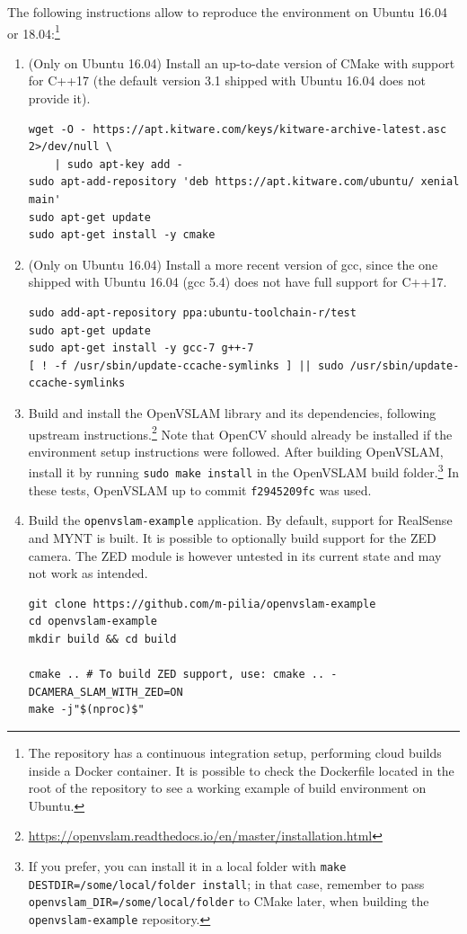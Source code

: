 \documentclass[11pt, letterpaper, twoside]{article}
\begin{document}
The following instructions allow to reproduce the environment on Ubuntu 16.04
or 18.04:\footnote{The repository has a continuous integration setup,
performing cloud builds inside a Docker container. It is possible to check
the Dockerfile located in the root of the repository to see a working
example of build environment on Ubuntu.}
\begin{enumerate}
    \item (Only on Ubuntu 16.04) Install an up-to-date version of CMake with
        support for C++17 (the default version 3.1 shipped with Ubuntu 16.04
        does not provide it).
\begin{verbatim}
wget -O - https://apt.kitware.com/keys/kitware-archive-latest.asc 2>/dev/null \
    | sudo apt-key add -
sudo apt-add-repository 'deb https://apt.kitware.com/ubuntu/ xenial main'
sudo apt-get update
sudo apt-get install -y cmake
\end{verbatim}

    \item (Only on Ubuntu 16.04) Install a more recent version of gcc, since
        the one shipped with Ubuntu 16.04 (gcc 5.4) does not have full support
        for C++17.
\begin{verbatim}
sudo add-apt-repository ppa:ubuntu-toolchain-r/test
sudo apt-get update
sudo apt-get install -y gcc-7 g++-7
[ ! -f /usr/sbin/update-ccache-symlinks ] || sudo /usr/sbin/update-ccache-symlinks
\end{verbatim}

    \item Build and install the OpenVSLAM library and its dependencies,
        following upstream
        instructions.\footnote{\url{https://openvslam.readthedocs.io/en/master/installation.html}}
        Note that OpenCV should already be installed if the environment setup
        instructions were followed. After building OpenVSLAM, install it by
        running \texttt{sudo make install} in the OpenVSLAM build
        folder.\footnote{If you prefer, you can install it in a local folder
        with \texttt{make DESTDIR=/some/local/folder install}; in that
        case, remember to pass \texttt{openvslam\_DIR=/some/local/folder}
        to CMake later, when building the \texttt{openvslam-example}
        repository.} In these tests, OpenVSLAM up to commit \texttt{f2945209fc} was
        used.

    \item Build the \texttt{openvslam-example} application. By default, support
        for RealSense and MYNT is built. It is possible to optionally build
        support for the ZED camera. The ZED module is however untested in its
        current state and may not work as intended.
\begin{verbatim}
git clone https://github.com/m-pilia/openvslam-example
cd openvslam-example
mkdir build && cd build

cmake .. # To build ZED support, use: cmake .. -DCAMERA_SLAM_WITH_ZED=ON
make -j"$(nproc)$"
\end{verbatim}

\end{enumerate}
\end{document}
